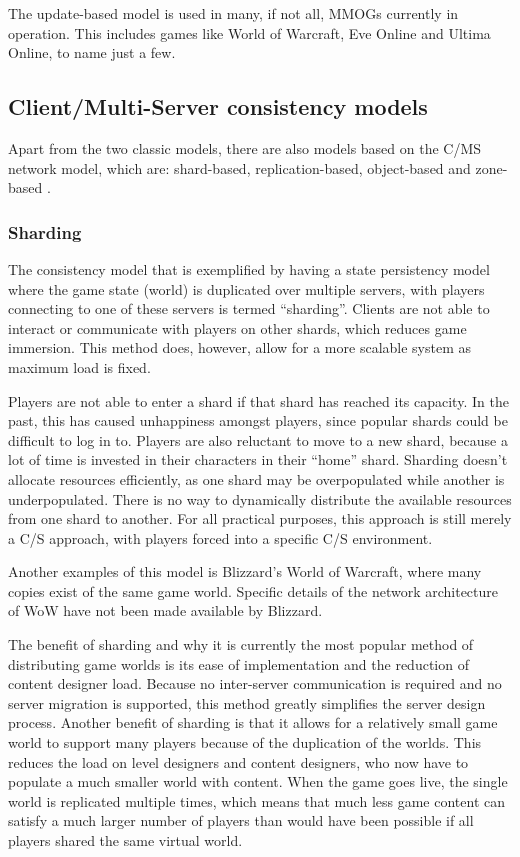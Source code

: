 \documentclass[10pt,a4paper,journal,cspaper,compsoc]{IEEEtran}
\begin{document}
The update-based model is used in many, if not all, MMOGs currently in operation. This includes games like World of Warcraft, Eve Online and Ultima
Online, to name just a few.

\subsection{Client/Multi-Server consistency models}
\label{cms_models}


Apart from the two classic models, there are also models based on the C/MS network model, which are: shard-based, replication-based, object-based and
zone-based \cite{Hu_voronoi_IM}.

\subsubsection{Sharding}

The consistency model that is exemplified by having a state persistency model where the game state (world) is duplicated over multiple servers, with
players connecting to one of these servers is termed ``sharding''. Clients are not able to interact or communicate with players on other shards,
which reduces game immersion. This method does, however, allow for a more scalable system as maximum load is fixed.

Players are not able to enter a shard if that shard has reached its capacity. In the past, this has caused unhappiness amongst players, since popular
shards could be difficult to log in to. Players are also reluctant to move to a new shard, because a lot of time is invested in their characters in
their ``home'' shard. Sharding doesn't allocate resources efficiently, as one shard may be overpopulated while another is underpopulated. There is no
way to dynamically distribute the available resources from one shard to another. For all practical purposes, this approach is still merely a C/S
approach, with players forced into a specific C/S environment.

Another examples of this model is Blizzard's World of Warcraft, where many copies exist of the same game world. Specific details of the network
architecture of WoW have not been made available by Blizzard.

The benefit of sharding and why it is currently the most popular method of distributing game worlds is its ease of implementation and the reduction
of content designer load. Because no inter-server communication is required and no server migration is supported, this method greatly simplifies the
server design process. Another benefit of sharding is that it allows for a relatively small game world to support many players because of the
duplication of the worlds. This reduces the load on level designers and content designers, who now have to populate a much smaller world with
content. When the game goes live, the single world is replicated multiple times, which means that much less game content can satisfy a much larger
number of players than would have been possible if all players shared the same virtual world.
\end{document}
